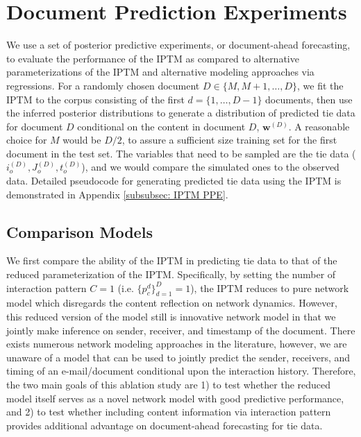 \documentclass[a4paper]{article}
\begin{document}
  \section{Document Prediction Experiments} \label{sec:PosteriorPredictive}
 We use a set of posterior predictive experiments, or document-ahead forecasting, to evaluate the performance of the IPTM as compared to alternative parameterizations of the IPTM and alternative modeling approaches via regressions. For a randomly chosen document $D \in \{M,M+1,\hdots, D\}$, we fit the IPTM to the corpus consisting of the first $d = \{1,\hdots,D-1\}$ documents, then use the inferred posterior distributions to generate a distribution of predicted tie data for document $D$ conditional on the content in document $D$, $\boldsymbol{w}^{(D)}$.  A reasonable choice for $M$ would be $D/2$, to assure a sufficient size training set for the first document in the test set. The variables that need to be sampled are the tie data ($i_o^{(D)}, J_o^{(D)}, t_o^{(D)}$), and we would compare the simulated ones to the observed data. Detailed pseudocode for generating predicted tie data using the IPTM is demonstrated in Appendix \ref{subsubsec: IPTM PPE}.

\subsection{Comparison Models}\label{subsec:ComparisonModels}
We first compare the ability of the IPTM in predicting tie data to that of the reduced parameterization of the IPTM. Specifically, by setting the number of interaction pattern $C = 1$ (i.e. $\{p_c^{d}\}_{d=1}^D = 1$), the IPTM reduces to pure network model which disregards the content reflection on network dynamics. However, this reduced version of the model still is innovative network model in that we jointly make inference on sender, receiver, and timestamp of the document. There exists numerous network modeling approaches in the literature, however, we are unaware of a model that can be used to jointly predict the sender, receivers, and timing of an e-mail/document conditional upon the interaction history. Therefore, the two main goals of this ablation study are 1) to test whether the reduced model itself serves as a novel network model with good predictive performance, and 2) to test whether including content information via interaction pattern provides additional advantage on document-ahead forecasting for tie data.
\end{document}
